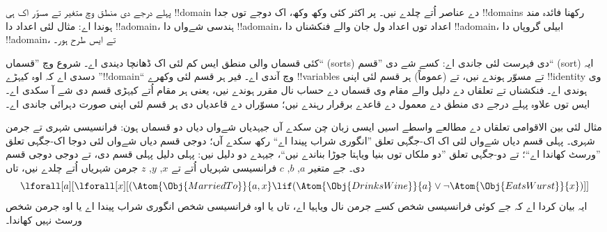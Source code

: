 \documentclass[../../../include/open-logic-section]{subfiles}
\begin{document}


پہلے درجے دی منطق وچ متغیر تے مسوّر اک ہی
!!{domain} دے عناصر اُتے چلدے نیں۔ پر اکثر کئی
وکھ وکھ، اک دوجے توں جدا !!{domain}s رکھنا فائدہ مند
ہوندا اے: مثال لئی اعداد دا !!a{domain}،
ہندسی شےواں دا !!a{domain}، اعداد توں اعداد ول جان
والے فنکشناں دا !!a{domain}، ابیلی گروپاں دا
!!a{domain}، تے ایس طرح ہور۔

کئی قسماں والی منطق ایس کم لئی اک ڈھانچا دیندی اے۔
شروع وچ ”قسماں“ (sorts) دی فہرست لئی جاندی اے: کسے شے
دی ”قسم“ (sort) ایہ دسدی اے کہ اوہ کیہڑے
”!!{domain}“ وچ آندی اے۔ فیر ہر قسم لئی وکھرے
!!{variable}s تے مسوّر ہوندے نیں، تے (عموماً) ہر
قسم لئی اپنی !!{identity} وی ہوندی اے۔ فنکشناں تے
تعلقاں دے دلیل والے مقام وی قسماں دے حساب نال
مقرر ہوندے نیں، یعنی ہر مقام اُتے کیہڑی قسم دی شے
آ سکدی اے۔ ایس توں علاوہ پہلے درجے دی منطق دے
معمول دے قاعدے برقرار رہندے نیں؛ مسوّراں دے
قاعدیاں دی ہر قسم لئی اپنی صورت دہرائی جاندی اے۔

مثال لئی بین الاقوامی تعلقاں دے مطالعے واسطے اسیں
ایسی زبان چن سکدے آں جیہدیاں شےواں دیاں دو قسماں
ہون: فرانسیسی شہری تے جرمن شہری۔ پہلی قسم دیاں
شےواں لئی اک اک-جگہی تعلق ”انگوری شراب پیندا اے“ رکھ
سکدے آں؛ دوجی قسم دیاں شےواں لئی دوجا اک-جگہی
تعلق ”ورسٹ کھاندا اے“؛ تے دو-جگہی تعلق ”دو
ملکاں توں بنیا ویاہتا جوڑا بناندے نیں“، جیہدے
دو دلیل نیں: پہلی دلیل پہلی قسم دی، تے دوجی
دوجی قسم دی۔ جے متغیر $a$, $b$, $c$ فرانسیسی
شہریاں اُتے تے $x$, $y$, $z$ جرمن شہریاں اُتے
چلدے نیں، تاں
\[
\lforall[a][\lforall[x][(\Atom{\Obj{MarriedTo}}{a,x} \lif
(\Atom{\Obj{DrinksWine}}{a} \lor \lnot \Atom{\Obj{EatsWurst}}{x})]]
\]
ایہ بیان کردا اے کہ جے کوئی فرانسیسی شخص کسے
جرمن نال ویاہیا اے، تاں یا اوہ فرانسیسی شخص
انگوری شراب پیندا اے یا اوہ جرمن شخص ورسٹ نہیں کھاندا۔
\end{document}
